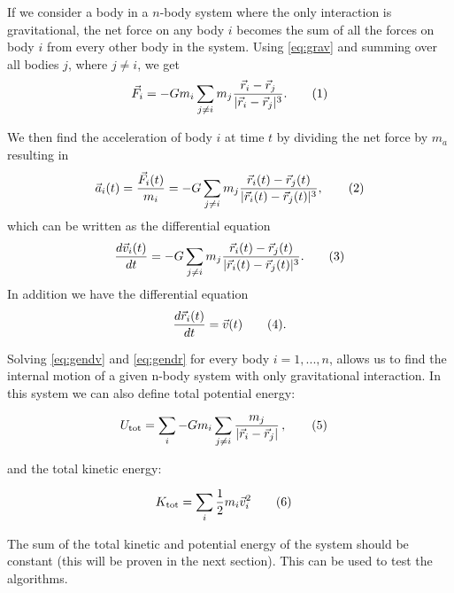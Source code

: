 \documentclass[reprint,english,notitlepage]{revtex4-1}  %
\newcommand\numberthis{\addtocounter{equation}{1}\tag{\theequation}}
\begin{document}
If we consider a body in a \(n\)-body system where the only interaction is gravitational, the net force on any body \(i\) becomes the sum of all the forces on body \(i\) from every other body in the system. Using \eqref{eq:grav} and summing over all bodies \(j\), where \(j\neq i\), we get
\begin{align*}
	\vec{F}_{i} = -Gm_{i}\sum_{j\neq i}m_{j}\frac{\vec{r}_{i}-\vec{r}_{j}}{|\vec{r}_{i}-\vec{r}_{j}|^{3}}. \numberthis \label{eq:gengrav}
\end{align*}

We then find the acceleration of body \(i\) at time \(t\) by dividing the net force by \(m_{a}\) resulting in
\begin{align*}
	\vec{a}_{i}(t) = \frac{\vec{F}_{i}(t)}{m_{i}} = -G\sum_{j\neq i}m_{j}\frac{\vec{r}_{i}(t)-\vec{r}_{j}(t)}{|\vec{r}_{i}(t)-\vec{r}_{j}(t)|^{3}}, \numberthis \label{eq:accel}
\end{align*}
which can be written as the differential equation
\begin{align*}
 	\frac{d\vec{v}_{i}(t)}{dt} = -G\sum_{j\neq i}m_{j}\frac{\vec{r}_{i}(t)-\vec{r}_{j}(t)}{|\vec{r}_{i}(t)-\vec{r}_{j}(t)|^{3}}. \numberthis \label{eq:gendv}
\end{align*}
In addition we have the differential equation
\begin{align*}
	\frac{d\vec{r}_{i}(t)}{dt} = \vec{v}(t) \numberthis \label{eq:gendr}.
\end{align*}

Solving \eqref{eq:gendv} and \eqref{eq:gendr} for every body \(i=1, ..., n\), allows us to find the internal motion of a given n-body system with only gravitational interaction. In this system we can also define total potential energy:

\begin{align*}
U_\text{tot} &= \sum\limits_i - G m_i \sum\limits_{j\neq i} \frac{m_j}{|\vec{r}_i - \vec{r}_j|} \, , \numberthis \label{eq:tot_pot_en}
\end{align*}

and the total kinetic energy:

\begin{align*}
K_\text{tot} &= \sum\limits_i \frac{1}{2}m_i \vec{v}_i^2 \numberthis \label{eq:tot_kin_en}
\end{align*}

The sum of the total kinetic and potential energy of the system should be constant (this will be proven in the next section). This can be used to test the algorithms.
\end{document}
